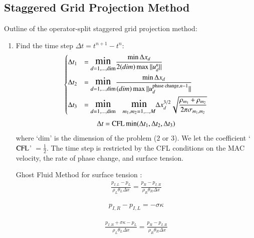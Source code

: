 \documentclass[preprint,12pt]{Definitions/elsarticle}
\newcommand{\tn}{\textnormal}
\begin{document}
\subsection{Staggered Grid Projection Method}
Outline of the operator-split staggered grid projection method:
\begin{enumerate}
	\item Find the time step $\Delta t=t^{n+1}-t^{n}$:
	\begin{equation}
	\begin{dcases}
	\Delta t_{1}&=\mathlarger{\mathlarger{\min}}_{d=1,\ldots,\tn{dim}}
	\frac{\min \Delta x_{d}}{2 (dim) \max||u_{d}^{n}||} \\	
	\Delta t_{2}&=\mathlarger{\mathlarger{\min}}_{d=1,\ldots,\tn{dim}}
	\frac{\min\Delta x_{d}}{(dim)\max||u_{d}^{\tn{phase change},n-1}||} \\
	\Delta t_{3}&=\mathlarger{\mathlarger{\min}}_{d=1,\ldots,\tn{dim}} \quad
	\mathlarger{\mathlarger{\min}}_{m_1,m_2=1,\ldots,M}
	\Delta x_{d}^{3/2}
	\sqrt{\frac{\rho_{m_1}+\rho_{m_2}}
		{2\pi\sigma_{m_1,m_2}}} 
	\end{dcases}
	\label{stiffconstraint}
	\end{equation}
	\begin{equation}
	\Delta t = \tn{CFL} \min(\Delta t_{1},\Delta t_{2},\Delta t_{3})
	\end{equation}
	where `dim' is the dimension of the problem ($2$ or $3$). We let the coefficient `$\tn{CFL}$' $= \frac{1}{2}$. The time step is restricted by the CFL conditions on the MAC velocity, the rate of phase change, and surface tension.\\



\newpage
\par\noindent
Ghost Fluid Method for surface tension \cite{kang2000boundary}:
\begin{eqnarray*}
\frac{p_{I,L}-p_{L}}{\rho_{L}\theta_{L}\Delta x}=
\frac{p_{R}-p_{I,R}}{\rho_{R}\theta_{R}\Delta x}
\end{eqnarray*}

\begin{eqnarray*}
p_{I,R}-p_{I,L}=-\sigma\kappa 
\end{eqnarray*}

\begin{eqnarray*}
\frac{p_{I,R}+\sigma\kappa-p_{L}}{\rho_{L}\theta_{L}\Delta x}=
\frac{p_{R}-p_{I,R}}{\rho_{R}\theta_{R}\Delta x}
\end{eqnarray*}


\end{enumerate}
\end{document}
